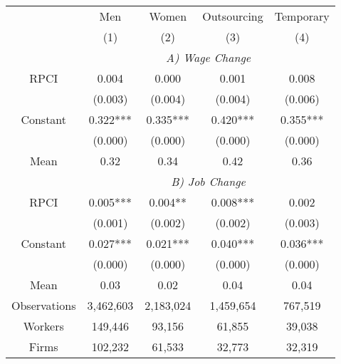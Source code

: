 \begin{tabular}{ccccc}
\toprule
\toprule
      & Men   & Women & Outsourcing & Temporary \\
      & (1)   & (2)   & (3)   & (4) \\
\cmidrule{2-5}      & \multicolumn{4}{c}{\textit{A) Wage Change}} \\
\midrule
RPCI  & 0.004 & 0.000 & 0.001 & 0.008 \\
      & (0.003) & (0.004) & (0.004) & (0.006) \\
Constant & 0.322*** & 0.335*** & 0.420*** & 0.355*** \\
      & (0.000) & (0.000) & (0.000) & (0.000) \\
Mean  & 0.32  & 0.34  & 0.42  & 0.36 \\
\cmidrule{2-5}      & \multicolumn{4}{c}{\textit{B) Job Change}} \\
\midrule
RPCI  & 0.005*** & 0.004** & 0.008*** & 0.002 \\
      & (0.001) & (0.002) & (0.002) & (0.003) \\
Constant & 0.027*** & 0.021*** & 0.040*** & 0.036*** \\
      & (0.000) & (0.000) & (0.000) & (0.000) \\
Mean  & 0.03  & 0.02  & 0.04  & 0.04 \\
\midrule
Observations & 3,462,603 & 2,183,024 & 1,459,654 & 767,519 \\
Workers & 149,446 & 93,156 & 61,855 & 39,038 \\
Firms & 102,232 & 61,533 & 32,773 & 32,319 \\
\bottomrule
\bottomrule
\end{tabular}%
